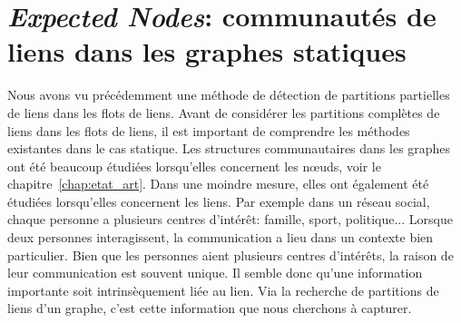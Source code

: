 \chapter{\emph{Expected Nodes}: communautés de liens dans les graphes statiques}
\minitoc

\label{chap:Expected_Node}
Nous avons vu précédemment une méthode de détection de partitions partielles de liens dans les flots de liens.
Avant de considérer les partitions complètes de liens dans les flots de liens, il est important de comprendre les méthodes existantes dans le cas statique.
Les structures communautaires dans les graphes ont été beaucoup étudiées lorsqu'elles concernent les n\oe{}uds, voir le chapitre~\ref{chap:etat_art}.
Dans une moindre mesure, elles ont également été étudiées lorsqu'elles concernent les liens.
Par exemple dans un réseau social, chaque personne a plusieurs centres d'intérêt: famille, sport, politique...
Lorsque deux personnes interagissent, la communication a lieu dans un contexte bien particulier.
Bien que les personnes aient plusieurs centres d'intérêts, la raison de leur communication est souvent unique.
Il semble donc qu'une information importante soit intrinsèquement liée au lien.
Via la recherche de partitions de liens d'un graphe, c'est cette information que nous cherchons à capturer.

